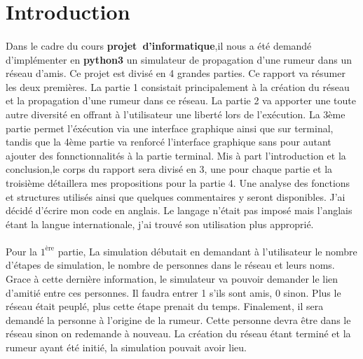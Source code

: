 \documentclass[a4paper,11pt]{article}
\begin{document}
\renewcommand{\contentsname}{Table des matières}
\tableofcontents
\newpage

\section {Introduction}

\paragraph{}
{Dans le cadre du cours \textbf{projet\ d'informatique},il nous a été demandé d'implémenter en \textbf{python3} un simulateur de propagation d'une rumeur dans un réseau d'amis.
Ce projet est divisé en 4 grandes parties. Ce rapport va résumer les deux premières. La partie 1 consistait principalement à la création du réseau et la propagation d'une rumeur dans ce réseau.
La partie 2 va apporter une toute autre diversité en offrant à l'utilisateur une liberté lors de l'exécution. La 3ème partie permet l'éxécution via une interface graphique ainsi que sur terminal,
tandis que la 4ème partie va renforcé l'interface graphique sans pour autant ajouter des fonnctionnalités à la partie terminal.
Mis à part l'introduction et la conclusion,le corps du rapport sera divisé en 3, une pour chaque partie et la troisième détaillera mes propositions pour la partie 4.
Une analyse des fonctions et structures utilisés ainsi que quelques commentaires y seront disponibles.
J'ai décidé d'écrire mon code en anglais. Le langage n'était pas imposé mais l'anglais étant la langue internationale, j'ai trouvé son utilisation plus approprié.}
\paragraph{}
{Pour la $1^{\textrm{ère}}$ partie, La simulation débutait en demandant à l'utilisateur le nombre d'étapes de simulation, le nombre de personnes dans le réseau et leurs noms.
Grace à cette dernière information, le simulateur va pouvoir demander le lien d'amitié entre ces personnes. Il faudra entrer 1 s'ils sont amis, 0 sinon. Plus le réseau était peuplé, plus cette étape prenait du temps. Finalement,
il sera demandé la personne à l'origine de la rumeur. Cette personne devra être dans le réseau sinon on redemande à nouveau. La création du réseau étant terminé et la rumeur ayant été initié, la simulation pouvait avoir lieu.}
\end{document}
